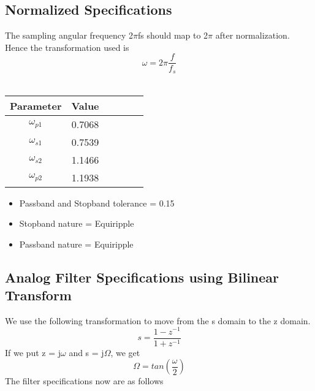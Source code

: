 \documentclass[12pt]{article}
\begin{document}
\subsection{\textbf{Normalized Specifications}}
The sampling angular frequency 2$\pi$fs should map to 2$\pi$ after normalization.
Hence the transformation used is
\begin{equation*}
    \omega = 2\pi\frac{f}{f_s}
\end{equation*}
\\

\begin{table}[!hbt]
		\begin{center}
		\begin{tabular}{|c|c|c|c|c|c|}
			\hline
			  Parameter & Value \\
			\hline
			 $\omega_{p1}$& 0.7068 \\
			\hline
			 $\omega_{s1}$ &  0.7539\\
			\hline
			 $\omega_{s2}$ & 1.1466\\
			\hline
		     $\omega_{p2}$ & 1.1938\\
			\hline
		
		\end{tabular}
		\end{center}
\end{table}


\begin{itemize}
    \item Passband and Stopband tolerance = 0.15
    \item Stopband nature = Equiripple
    \item Passband nature = Equiripple
\end{itemize}






\subsection{\textbf{Analog Filter Specifications using Bilinear Transform}}
We use the following transformation to move from the s domain to the z
domain.
\begin{equation*}
    s = \frac{1-z^{-1}}{1+z^{-1}}
    
\end{equation*}
If we put z = j$\omega$ and s = j$\Omega$, we get
\begin{equation*}
    \Omega = tan(\frac{\omega}{2})
\end{equation*}
\newpage
The filter specifications now are as follows
\end{document}
